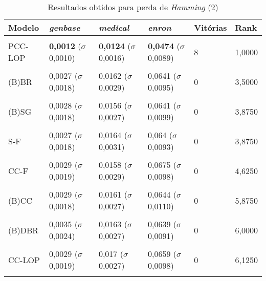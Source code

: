 \begin{table}[htbp]
	\centering
	\caption{Resultados obtidos para perda de \textit{{Hamming}} (2)}
		\begin{tabular}
        { p{0.88in} p{0.88in} p{0.88in} p{0.88in} p{0.88in} p{0.88in} }
        
        \hline
Modelo & \textit{genbase} & \textit{medical} & \textit{enron} & \textbf{Vitórias} & \textbf{Rank} \\ 
\hline \\

PCC-LOP & \textbf{0,0012} \newline ($\sigma$ 0,0010) & \textbf{0,0124} \newline ($\sigma$ 0,0016) & \textbf{0,0474} \newline ($\sigma$ 0,0089) & 8 & 1,0000 \\ \\
(B)BR & 0,0027 \newline ($\sigma$ 0,0018) & 0,0162 \newline ($\sigma$ 0,0029) & 0,0641 \newline ($\sigma$ 0,0095) & 0 & 3,5000 \\ \\
(B)SG & 0,0028 \newline ($\sigma$ 0,0018) & 0,0156 \newline ($\sigma$ 0,0027) & 0,0641 \newline ($\sigma$ 0,0099) & 0 & 3,8750 \\ \\
S-F & 0,0027 \newline ($\sigma$ 0,0018) & 0,0164 \newline ($\sigma$ 0,0031) & 0,064 \newline ($\sigma$ 0,0093) & 0 & 3,8750 \\ \\
CC-F & 0,0029 \newline ($\sigma$ 0,0019) & 0,0158 \newline ($\sigma$ 0,0029) & 0,0675 \newline ($\sigma$ 0,0098) & 0 & 4,6250 \\ \\
(B)CC & 0,0029 \newline ($\sigma$ 0,0018) & 0,0161 \newline ($\sigma$ 0,0027) & 0,0644 \newline ($\sigma$ 0,0110) & 0 & 5,8750 \\ \\
(B)DBR & 0,0035 \newline ($\sigma$ 0,0024) & 0,0163 \newline ($\sigma$ 0,0027) & 0,0639 \newline ($\sigma$ 0,0091) & 0 & 6,0000 \\ \\
CC-LOP & 0,0029 \newline ($\sigma$ 0,0019) & 0,017 \newline ($\sigma$ 0,0027) & 0,0659 \newline ($\sigma$ 0,0098) & 0 & 6,1250 \\ \\


\end{tabular}
\end{table}
